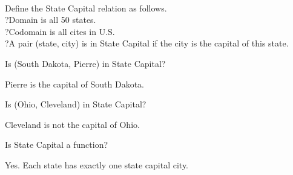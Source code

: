 \documentclass{ximera}
\begin{document}
\quad \\





\begin{question}

Define the State Capital relation as follows. \\?Domain is all 50 states. \\ ?Codomain is all cites in U.S. \\?A pair (state, city) is in State Capital if the city is the capital of this state.


Is (South Dakota, Pierre) in State Capital?
\begin{multipleChoice}
\end{multipleChoice}
\begin{feedback}
Pierre is the capital of South Dakota.
\end{feedback}


Is (Ohio, Cleveland) in State Capital?
\begin{multipleChoice}
\end{multipleChoice}
\begin{feedback}
Cleveland is not the capital of Ohio.
\end{feedback}


Is State Capital a function?
\begin{multipleChoice}
\end{multipleChoice}
\begin{feedback}
Yes. Each state has exactly one state capital city.
\end{feedback}

\end{question}



\quad \\
\end{document}
